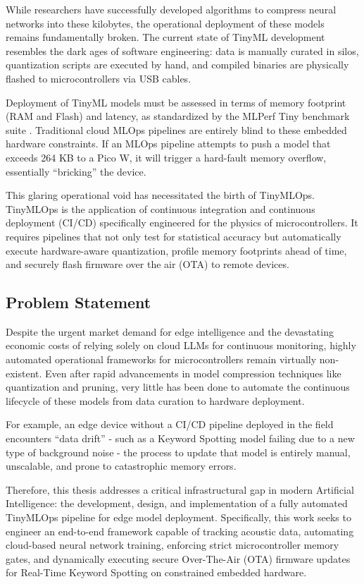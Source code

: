 \documentclass[11pt,a4paper,openany]{book}
\begin{document}
While researchers have successfully developed algorithms to compress neural networks into these kilobytes, the operational deployment of these models remains fundamentally broken. The current state of TinyML development resembles the dark ages of software engineering: data is manually curated in silos, quantization scripts are executed by hand, and compiled binaries are physically flashed to microcontrollers via USB cables.

Deployment of TinyML models must be assessed in terms of memory footprint (RAM and Flash) and latency, as standardized by the MLPerf Tiny benchmark suite \cite{8}. Traditional cloud MLOps pipelines are entirely blind to these embedded hardware constraints. If an MLOps pipeline attempts to push a model that exceeds 264 KB to a Pico W, it will trigger a hard-fault memory overflow, essentially ``bricking'' the device.

This glaring operational void has necessitated the birth of TinyMLOps. TinyMLOps is the application of continuous integration and continuous deployment (CI/CD) specifically engineered for the physics of microcontrollers. It requires pipelines that not only test for statistical accuracy but automatically execute hardware-aware quantization, profile memory footprints ahead of time, and securely flash firmware over the air (OTA) to remote devices.

\subsection{Problem Statement}
Despite the urgent market demand for edge intelligence and the devastating economic costs of relying solely on cloud LLMs for continuous monitoring, highly automated operational frameworks for microcontrollers remain virtually non-existent. Even after rapid advancements in model compression techniques like quantization and pruning, very little has been done to automate the continuous lifecycle of these models from data curation to hardware deployment.

For example, an edge device without a CI/CD pipeline deployed in the field encounters ``data drift'' - such as a Keyword Spotting model failing due to a new type of background noise - the process to update that model is entirely manual, unscalable, and prone to catastrophic memory errors.

Therefore, this thesis addresses a critical infrastructural gap in modern Artificial Intelligence: the development, design, and implementation of a fully automated TinyMLOps pipeline for edge model deployment. Specifically, this work seeks to engineer an end-to-end framework capable of tracking acoustic data, automating cloud-based neural network training, enforcing strict microcontroller memory gates, and dynamically executing secure Over-The-Air (OTA) firmware updates for Real-Time Keyword Spotting on constrained embedded hardware.
\end{document}

